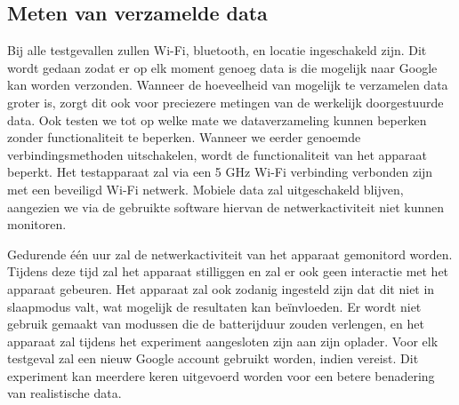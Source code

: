 \subsection{Meten van verzamelde data}
Bij alle testgevallen zullen Wi-Fi, bluetooth, en locatie ingeschakeld zijn. Dit wordt gedaan zodat er op elk moment genoeg data is die mogelijk naar Google kan worden verzonden. Wanneer de hoeveelheid van mogelijk te verzamelen data groter is, zorgt dit ook voor preciezere metingen van de werkelijk doorgestuurde data. Ook  testen we tot op welke mate we dataverzameling kunnen beperken zonder functionaliteit te beperken. Wanneer we eerder genoemde verbindingsmethoden uitschakelen, wordt de functionaliteit van het apparaat beperkt. Het testapparaat zal via een 5 GHz Wi-Fi verbinding verbonden zijn met een beveiligd Wi-Fi netwerk. Mobiele data zal uitgeschakeld blijven, aangezien we via de gebruikte software hiervan de netwerkactiviteit niet kunnen monitoren.

Gedurende één uur zal de netwerkactiviteit van het apparaat gemonitord worden. Tijdens deze tijd zal het apparaat stilliggen en zal er ook geen interactie met het apparaat gebeuren. Het apparaat zal ook zodanig ingesteld zijn dat dit niet in slaapmodus valt, wat mogelijk de resultaten kan beïnvloeden. Er wordt niet gebruik gemaakt van modussen die de batterijduur zouden verlengen, en het apparaat zal tijdens het experiment aangesloten zijn aan zijn oplader. Voor elk testgeval zal een nieuw Google account gebruikt worden, indien vereist. Dit experiment kan meerdere keren uitgevoerd worden voor een betere benadering van realistische data.




